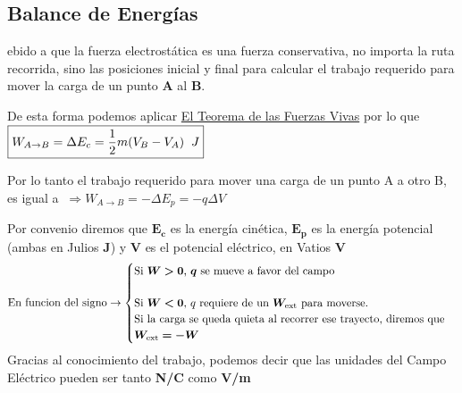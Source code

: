 \subsection{Balance de Energías}
\begin{wrapfigure}{r}{5cm}
        
\end{wrapfigure}
\noindent ebido a que la fuerza electrostática es una fuerza conservativa, no importa la ruta recorrida, sino las posiciones inicial y final para calcular el trabajo requerido para mover la carga de un punto \textbf{A} al \textbf{B}.\par
\vspace{0.5cm}
\hspace{-.725cm}
De esta forma podemos aplicar \underline{El Teorema de las Fuerzas Vivas} por lo que \(\boxed{W_{A \to B} = \Delta E_c = \frac{1}{2} m (V_B -V_A) \hspace{2mm}J}\)
\par
\vspace{0.5cm}
\hspace{-.6cm}
Por lo tanto el trabajo requerido para mover una carga de un punto A a otro B, es igual a \(\ \Rightarrow \boxed{W_{A \to B} =-\Delta E_p = -q \Delta V}\) \par
\vspace{0.5cm}
\noindent Por convenio diremos que  \(\bm{E_c}\) es la energía cinética, \(\bm{E_p}\) es la energía potencial (ambas en Julios \textbf{J}) y \(\bm{V}\) es el potencial eléctrico, en Vatios \textbf{V}
\[
        \textnormal{En funcion del signo} \rightarrow
        \begin{cases}
                \textnormal{Si \(\bm{W > 0}\), \(\bm{q}\) se mueve a favor del campo} \\
                \\
                \textnormal{Si \(\bm{W < 0}\), \(q\) requiere de un \(\bm{W_{\textnormal{ext}}}\) para moverse.}
                \\
                \textnormal{Si la carga se queda quieta al recorrer ese trayecto, diremos que}
                \\
                \textnormal{\(\bm{W_\textnormal{ext} = -W}\)}
        \end{cases}
\]
\noindent Gracias al conocimiento del trabajo, podemos decir que las unidades del Campo Eléctrico pueden ser tanto \textbf{N/C} como \textbf{V/m}

